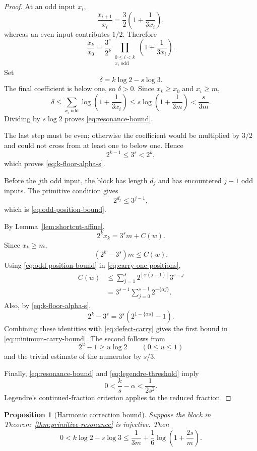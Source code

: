 \documentclass[11pt,reqno]{amsart}
\numberwithin{equation}{section}
\newtheorem{proposition}[theorem]{Proposition}
\theoremstyle{definition}
\theoremstyle{remark}
\newcommand{\floor}[1]{\left\lfloor #1\right\rfloor}
\begin{document}
\begin{proof}
At an odd input $x_i$,
\[
\frac{x_{i+1}}{x_i}
=
\frac32\left(1+\frac{1}{3x_i}\right),
\]
whereas an even input contributes $1/2$.  Therefore
\begin{equation}\label{eq:product-correction}
\frac{x_k}{x_0}
=
\frac{3^s}{2^k}
\prod_{\substack{0\le i<k\\x_i\text{ odd}}}
\left(1+\frac1{3x_i}\right).
\end{equation}
Set
\[
\delta=k\log2-s\log3.
\]
The final coefficient is below one, so $\delta>0$.  Since $x_k\ge x_0$ and
$x_i\ge m$,
\[
\delta
\le
\sum_{x_i\text{ odd}}
\log\left(1+\frac1{3x_i}\right)
\le
s\log\left(1+\frac1{3m}\right)
<\frac{s}{3m}.
\]
Dividing by $s\log2$ proves \eqref{eq:resonance-bound}.

The last step must be even; otherwise the coefficient would be multiplied by
$3/2$ and could not cross from at least one to below one.  Hence
\[
2^{k-1}\le3^s<2^k,
\]
which proves \eqref{eq:k-floor-alpha-s}.

Before the $j$th odd input, the block has length $d_j$ and has encountered
$j-1$ odd inputs.  The primitive condition gives
\[
2^{d_j}\le3^{j-1},
\]
which is \eqref{eq:odd-position-bound}.

By Lemma~\ref{lem:shortcut-affine},
\[
2^kx_k=3^sm+C(w).
\]
Since $x_k\ge m$,
\begin{equation}\label{eq:defect-carry}
(2^k-3^s)m\le C(w).
\end{equation}
Using \eqref{eq:odd-position-bound} in
\eqref{eq:carry-one-positions},
\[
\begin{aligned}
C(w)
&\le
\sum_{j=1}^s
2^{\floor{\alpha(j-1)}}3^{s-j}\\
&=
3^{s-1}\sum_{j=0}^{s-1}2^{-\{\alpha j\}}.
\end{aligned}
\]
Also, by \eqref{eq:k-floor-alpha-s},
\[
2^k-3^s
=
3^s\left(2^{1-\{\alpha s\}}-1\right).
\]
Combining these identities with \eqref{eq:defect-carry} gives the first
bound in \eqref{eq:minimum-carry-bound}.  The second follows from
\[
2^u-1\ge u\log2
\qquad(0\le u\le1)
\]
and the trivial estimate of the numerator by $s/3$.

Finally, \eqref{eq:resonance-bound} and
\eqref{eq:legendre-threshold} imply
\[
0<\frac{k}{s}-\alpha<\frac1{2s^2}.
\]
Legendre's continued-fraction criterion applies to the reduced fraction.
\end{proof}

\begin{proposition}[Harmonic correction bound]\label{prop:harmonic-correction}
Suppose the block in Theorem~\ref{thm:primitive-resonance} is injective.
Then
\begin{equation}\label{eq:harmonic-drift}
0<k\log2-s\log3
\le
\frac1{3m}
+
\frac16\log\left(1+\frac{2s}{m}\right).
\end{equation}
\end{proposition}
\end{document}
